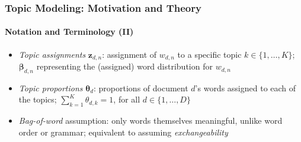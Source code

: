 \documentclass[xcolor=dvipsnames]{beamer}
\begin{document}
\begin{frame}
\frametitle{Topic Modeling: Motivation and Theory}
\framesubtitle{Notation and Terminology (II)}
\begin{itemize}
\item \textit{Topic assignments} $\boldsymbol{z}_{d,n}$: assignment of $w_{d,n}$ to a specific topic $k \in \{1,\dots,K\}$; $\boldsymbol{\beta}_{d,n}$ representing the (assigned) word distribution for $w_{d,n}$
\item \textit{Topic proportions} $\boldsymbol{\theta}_d$: proportions of document $d$'s words assigned to each of the topics; $\sum_{k=1}^{K}\theta_{d,k}=1$, for all $d \in \{1,\dots,D\}$
\item \textit{Bag-of-word} assumption: only words themselves meaningful, unlike word order or grammar; equivalent to assuming \textit{exchangeability} \cite{aldous1985exchangeability}
\end{itemize}
\end{frame}
\end{document}
